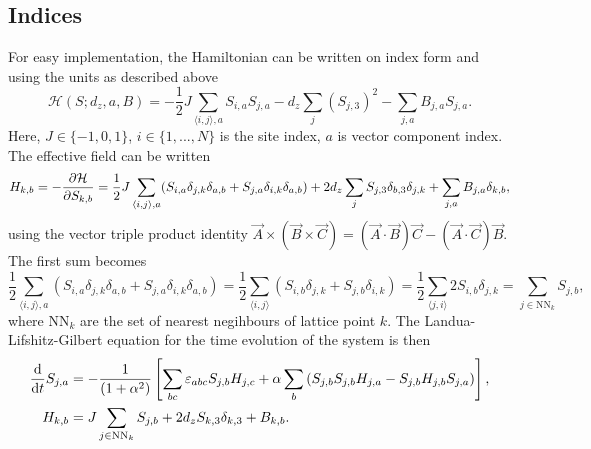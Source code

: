 \documentclass{article}
\begin{document}
    \subsection*{Indices}
    For easy implementation, the Hamiltonian can be written on index form and using the units as described above
    \begin{equation*}
        \mathcal{H}(S; d_z, a, B) = -\frac{1}{2} J \sum_{\langle i, j \rangle, a} S_{i, a} S_{j, a} - d_z \sum_{j} (S_{j,3})^2 -  \sum_{j, a} B_{j, a} S_{j,a}.
    \end{equation*}
    Here, $J\in\{-1, 0, 1\}$, $i\in\{1, ..., N\}$ is the site index, $a$ is vector component index. The effective field can be written
    \begin{align*}
        H_{k, b} = - \pdv{\mathcal{H}}{S_{k, b}} = \frac{1}{2} J \sum_{\langle i, j \rangle, a} (S_{i, a}\delta_{j,k}\delta_{a, b} + S_{j, a}\delta_{i,k}\delta_{a, b}) + 2 d_z \sum_{j} S_{j,3} \delta_{b, 3}\delta_{j, k} +  \sum_{j, a} B_{j, a} \delta_{k,b},
    \end{align*}
    using the vector triple product identity $\vec A \times (\vec B \times \vec C) = (\vec A \cdot \vec B) \vec C - (\vec A \cdot \vec C) \vec B$. The first sum becomes
    \begin{equation*}
        \frac{1}{2}\sum_{\langle i, j \rangle, a} (S_{i, a}\delta_{j,k}\delta_{a, b} + S_{j, a}\delta_{i,k}\delta_{a, b}) = \frac{1}{2}\sum_{\langle i, j \rangle} (S_{i, b}\delta_{j,k} + S_{j, b}\delta_{i,k}) = \frac{1}{2}\sum_{\langle j, i \rangle} 2S_{i, b} \delta_{j, k} = \sum_{j \in \mathrm{NN}_k} S_{j, b},
    \end{equation*}
    where $\mathrm{NN}_k$ are the set of nearest negihbours of lattice point $k$. The Landua-Lifshitz-Gilbert equation for the time evolution of the system is then
    \begin{align}
        \dv{t} S_{j, a} &= - \frac{1}{(1 + \alpha^2)}\left[\sum_{b c}\varepsilon_{abc}S_{j, b}H_{j,c} + \alpha \sum_{b}\left(S_{j, b}S_{j, b}H_{j, a} - S_{j, b}H_{j, b}S_{j, a}\right)\right], \label{LLG} \\
        H_{k, b} &= J\sum_{j \in \mathrm{NN}_k} S_{j, b} + 2d_z S_{k, 3} \delta_{k, 3} +  B_{k, b}. \label{effective field}
    \end{align}

    
\end{document}
